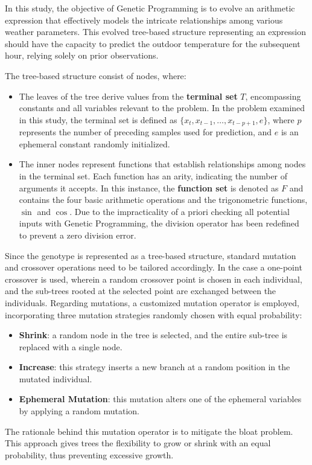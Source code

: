 In this study, the objective of Genetic Programming is to evolve an arithmetic expression that effectively models the intricate relationships among various weather parameters. This evolved tree-based structure representing an expression should have the capacity to predict the outdoor temperature for the subsequent hour, relying solely on prior observations.


The tree-based structure consist of nodes, where:
\begin{itemize}
    \item The leaves of the tree derive values from the \textbf{terminal set} $T$, encompassing constants and all variables relevant to the problem. In the problem examined in this study, the terminal set is defined as $\{x_t, x_{t-1}, \ldots, x_{t-p+1}, e\}$, where $p$ represents the number of preceding samples used for prediction, and $e$ is an ephemeral constant randomly initialized.
    \item The inner nodes represent functions that establish relationships among nodes in the terminal set. Each function has an arity, indicating the number of arguments it accepts. In this instance, the \textbf{function set} is denoted as $F$ and contains the four basic arithmetic operations and the trigonometric functions, $\sin$ and $\cos$. Due to the impracticality of a priori checking all potential inputs with Genetic Programming, the division operator has been redefined to prevent a zero division error.
\end{itemize}

Since the genotype is represented as a tree-based structure, standard mutation and crossover operations need to be tailored accordingly. In the case a one-point crossover is used, wherein a random crossover point is chosen in each individual, and the sub-trees rooted at the selected point are exchanged between the individuals. Regarding mutations, a customized mutation operator is employed, incorporating three mutation strategies randomly chosen with equal probability:

\begin{itemize}
    \item \textbf{Shrink}: a random node in the tree is selected, and the entire sub-tree is replaced with a single node.
    \item \textbf{Increase}: this strategy inserts a new branch at a random position in the mutated individual.
    \item \textbf{Ephemeral Mutation}: this mutation alters one of the ephemeral variables by applying a random mutation.
\end{itemize}

The rationale behind this mutation operator is to mitigate the bloat problem. This approach gives trees the flexibility to grow or shrink with an equal probability, thus preventing excessive growth.


